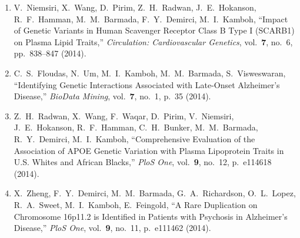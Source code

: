 \begin{enumerate}
\item V.\ Niemsiri, X.\ Wang, D.\ Pirim, Z.\ H.\ Radwan, J.\ E.\ Hokanson, R.\ F.\ Hamman, M.\ M.\ Barmada, F.\ Y.\ Demirci, M.\ I.\ Kamboh, ``Impact of Genetic Variants in Human Scavenger Receptor Class B Type I (SCARB1) on Plasma Lipid Traits,'' \textit{Circulation: Cardiovascular Genetics}, vol.\ \textbf{7}, no.\ 6, pp.\ 838--847 (2014).

\item C.\ S.\ Floudas, N.\ Um, M.\ I.\ Kamboh, M.\ M.\ Barmada, S.\ Visweswaran, ``Identifying Genetic Interactions Associated with Late-Onset Alzheimer's Disease,'' \textit{BioData Mining}, vol.\ \textbf{7}, no.\ 1, p.\ 35 (2014).

\item Z.\ H.\ Radwan, X.\ Wang, F.\ Waqar, D.\ Pirim, V.\ Niemsiri, J.\ E.\ Hokanson, R.\ F.\ Hamman, C.\ H.\ Bunker, M.\ M.\ Barmada, R.\ Y.\ Demirci, M.\ I.\ Kamboh, ``Comprehensive Evaluation of the Association of APOE Genetic Variation with Plasma Lipoprotein Traits in U.S. Whites and African Blacks,'' \textit{PloS One}, vol.\ \textbf{9}, no.\ 12, p.\ e114618 (2014).

\item X.\ Zheng, F.\ Y.\ Demirci, M.\ M.\ Barmada, G.\ A.\ Richardson, O.\ L.\ Lopez, R.\ A.\ Sweet, M.\ I.\ Kamboh, E.\ Feingold, ``A Rare   Duplication on Chromosome 16p11.2 is Identified in Patients with Psychosis in Alzheimer's Disease,'' \textit{PloS One}, vol.\ \textbf{9}, no.\ 11, p.\ e111462 (2014).


\end{enumerate}
